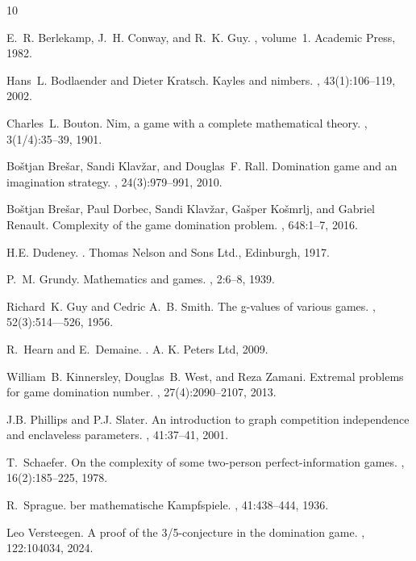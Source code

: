 \documentclass[12pt]{article}
\begin{document}

%

\begin{thebibliography}{10}

E.~R. Berlekamp, J.~H. Conway, and R.~K. Guy.
, volume~1.
\newblock Academic Press, 1982.

Hans~L. Bodlaender and Dieter Kratsch.
\newblock Kayles and nimbers.
, 43(1):106--119, 2002.

Charles~L. Bouton.
\newblock Nim, a game with a complete mathematical theory.
, 3(1/4):35--39, 1901.

Bo\v{s}tjan Bre\v{s}ar, Sandi Klav\v{z}ar, and Douglas~F. Rall.
\newblock Domination game and an imagination strategy.
, 24(3):979--991, 2010.

Bo\v{s}tjan Bre\v{s}ar, Paul Dorbec, Sandi Klav\v{z}ar, Ga\v{s}per Ko\v{s}mrlj, and Gabriel Renault.
\newblock Complexity of the game domination problem.
, 648:1--7, 2016.

H.E. Dudeney.
.
\newblock Thomas Nelson and Sons Ltd., Edinburgh, 1917.

P.~M. Grundy.
\newblock Mathematics and games.
, 2:6--8, 1939.

Richard~K. Guy and Cedric A.~B. Smith.
\newblock The g-values of various games.
, 52(3):514--–526, 1956.

R.~Hearn and E.~Demaine.
.
\newblock A. K. Peters Ltd, 2009.

William~B. Kinnersley, Douglas~B. West, and Reza Zamani.
\newblock Extremal problems for game domination number.
, 27(4):2090--2107, 2013.

J.B. Phillips and P.J. Slater.
\newblock An introduction to graph competition independence and enclaveless
  parameters.
, 41:37–41, 2001.

T.~Schaefer.
\newblock On the complexity of some two-person perfect-information games.
, 16(2):185--225, 1978.

R.~Sprague.
ber mathematische {Kampfspiele}.
, 41:438--444, 1936.

Leo Versteegen.
\newblock A proof of the 3/5-conjecture in the domination game.
, 122:104034, 2024.

\end{thebibliography}
\end{document}
